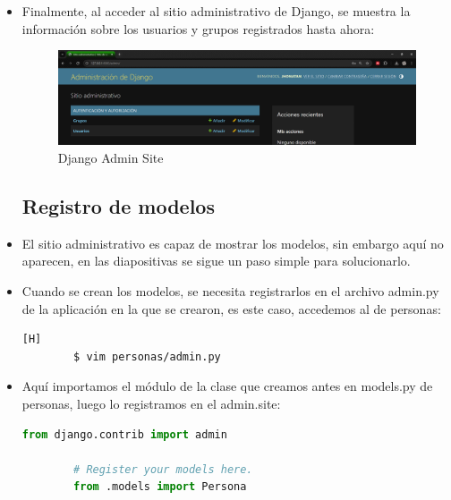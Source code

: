 \documentclass{article}
\begin{document}
\begin{itemize}
            \item Finalmente, al acceder al sitio administrativo de Django, se muestra la información sobre los usuarios y grupos registrados hasta ahora:
            
        \begin{figure}[H]
            \centering
            \includegraphics[width=1\linewidth]{img/Admin_site.png}
            \caption{Django Admin Site}
            \label{fig:enter-label}
        \end{figure}
            
        \subsection{Registro de modelos}
            \item El sitio administrativo es capaz de mostrar los modelos, sin embargo aquí no aparecen, en las diapositivas se sigue un paso simple para solucionarlo.
            \item Cuando se crean los modelos, se necesita registrarlos en el archivo admin.py de la aplicación en la que se crearon, es este caso, accedemos al de personas:
        \begin{lstlisting}[language=bash,caption={Ingresando a admin.py}][H]
        $ vim personas/admin.py
        \end{lstlisting}

            \item Aquí importamos el módulo de la clase que creamos antes en models.py de personas, luego lo registramos en el admin.site:

        \begin{lstlisting}[language=Python, caption={Registro del modelo Persona}]
        from django.contrib import admin
        
        # Register your models here.
        from .models import Persona
        

\end{lstlisting}
\end{itemize}
\end{document}
